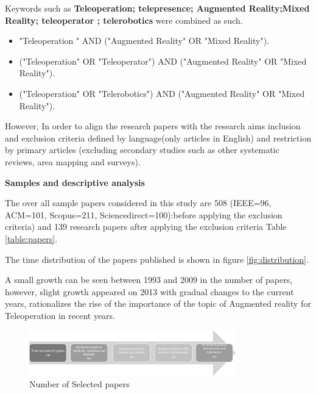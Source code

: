 Keywords such as \textbf{Teleoperation; telepresence; Augmented Reality;Mixed Reality; teleoperator ; telerobotics} were combined as such.
\begin{itemize}
    \item "Teleoperation " AND ("Augmented Reality" OR "Mixed Reality").
    \item ("Teleoperation" OR "Teleoperator") AND ("Augmented Reality" OR "Mixed Reality").
    \item ("Teleoperation" OR "Telerobotics") AND ("Augmented Reality" OR "Mixed Reality").
\end{itemize}

However, In order to align the research papers with the research aims inclusion and exclusion criteria  defined by language(only articles in English) and restriction by primary articles (excluding secondary studies such as other systematic reviews, area mapping and surveys).

\textbf{Samples and descriptive analysis}

The over all sample papers considered in this study are 508 (IEEE=96, ACM=101, Scopus=211, Sciencedirect=100):before applying the exclusion criteria) and 139 research papers after applying the exclusion criteria Table \ref{table:papers}.

The time distribution of the papers published is shown in figure \ref{fig:distribution}.

A small growth can be seen between 1993 and 2009 in the number of papers, however, slight growth appeared on 2013 with gradual changes to the current years, rationalizes the rise of the importance of the topic of Augmented reality for Teleoperation in recent years.

\begin{figure}[h]
    \centering
    \includegraphics[width=0.8\textwidth]{images/Selected_papers.png}
    \caption{Number of Selected papers}
    \label{fig:PapersNumber}
\end{figure}



